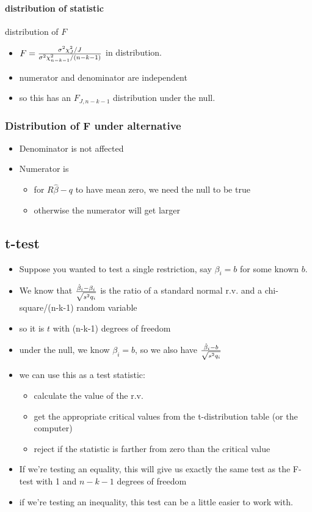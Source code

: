 \documentclass[11pt]{article}
\begin{document}
\paragraph{distribution of statistic}
\label{sec-2-2-2-3}

       distribution of $F$
\begin{itemize}
\item $F = {\sigma^2 \chi_J^2 / J \over \sigma^2 \chi_{n-k-1}^2 /
         (n-k-1)}$ in distribution.
\item numerator and denominator are independent
\item so this has an $F_{J, n-k-1}$ distribution under the null.
\end{itemize}
\subsubsection{Distribution of F under alternative}
\label{sec-2-2-3}

\begin{itemize}
\item Denominator is not affected
\item Numerator is
\begin{itemize}
\item for $R\hat\beta - q$ to have mean zero, we need the null to
          be true
\item otherwise the numerator will get larger
\end{itemize}
\end{itemize}
\subsection{t-test}
\label{sec-2-3}

\begin{itemize}
\item Suppose you wanted to test a single restriction, say $\beta_i =
       b$ for some known $b$.
\item We know that ${\hat\beta_i - \beta_i \over \sqrt{s^2 q_i}}$ is
       the ratio of a standard normal r.v. and a chi-square/(n-k-1)
       random variable
\item so it is $t$ with (n-k-1) degrees of freedom
\item under the null, we know $\beta_i = b$, so we also have
       ${\hat\beta_i - b \over \sqrt{s^2 q_i}}$
\item we can use this as a test statistic:
\begin{itemize}
\item calculate the value of the r.v.
\item get the appropriate critical values from the t-distribution
         table (or the computer)
\item reject if the statistic is farther from zero than the
         critical value
\end{itemize}
\item If we're testing an equality, this will give us exactly the
       same test as the F-test with 1 and $n-k-1$ degrees of freedom
\item if we're testing an inequality, this test can be a little
       easier to work with.
\end{itemize}
\end{document}
